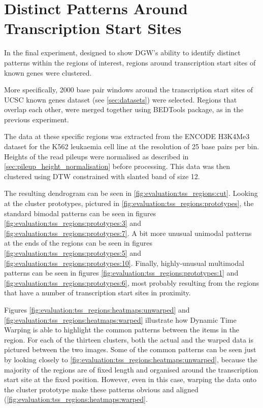 \documentclass[parskip]{cs4rep}
\newcommand{\histonemodification}[1]{#1}
\begin{document}
\section{Distinct Patterns Around Transcription Start Sites}
\label{sec:evaluation:tss}

In the final experiment, designed to show DGW's ability to identify distinct patterns within the regions of interest, regions around transcription start sites of known genes were clustered.

More specifically, 2000 base pair windows around the transcription start sites of UCSC known genes dataset (see \autoref{sec:datasets}) were selected. Regions that overlap each other, were merged 
together using BEDTools package, as in the previous experiment.

The data at these specific regions was extracted from the ENCODE \histonemodification{H3K4Me3} dataset for the K562 leukaemia  cell line at the resolution of 25 base pairs per bin. Heights of the read pileups were normalised as described in \autoref{sec:pileup_height_normalisation} before processing.
This data was then clustered using DTW constrained with slanted band of size 12.

The resulting dendrogram can be seen in \autoref{fig:evaluation:tss_regions:cut}. Looking at the cluster prototypes, pictured in \autoref{fig:evaluation:tss_regions:prototypes}, the standard bimodal patterns can be seen in figures \ref{fig:evaluation:tss_regions:prototypes:3} and \ref{fig:evaluation:tss_regions:prototypes:7}. A bit more unusual unimodal patterns at the ends of the regions can be seen in figures \ref{fig:evaluation:tss_regions:prototypes:5} and \ref{fig:evaluation:tss_regions:prototypes:10}. Finally, highly-unusual multimodal patterns can be seen in figures \ref{fig:evaluation:tss_regions:prototypes:1} and \ref{fig:evaluation:tss_regions:prototypes:6}, most probably resulting from the regions that have a number of transcription start sites in proximity.

Figures \ref{fig:evaluation:tss_regions:heatmaps:unwarped} and \ref{fig:evaluation:tss_regions:heatmaps:warped} illustrate how Dynamic Time Warping is able to highlight the common patterns between the items in the region. For each of the thirteen clusters, both the actual and the warped data is pictured between the two images. Some of the common patterns can be seen just by looking closely to \autoref{fig:evaluation:tss_regions:heatmaps:unwarped}, because the majority of the regions are of fixed length and organised around the transcription start site at the fixed position. However, even in this case, warping the data onto the cluster prototype make these patterns obvious and aligned (\autoref{fig:evaluation:tss_regions:heatmaps:warped}. 
\end{document}
